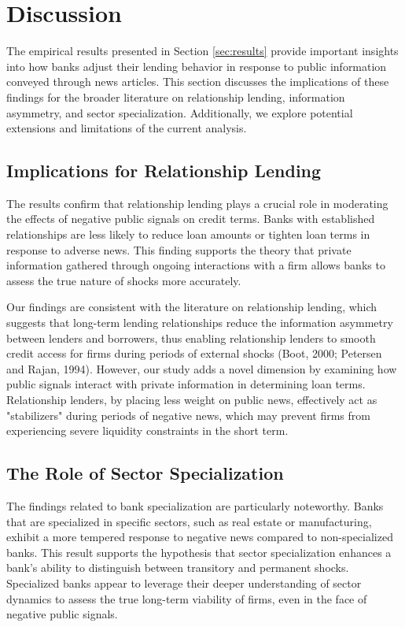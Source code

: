 \section{Discussion}
\label{sec:discussion}

The empirical results presented in Section \ref{sec:results} provide important insights into how banks adjust their lending behavior in response to public information conveyed through news articles. This section discusses the implications of these findings for the broader literature on relationship lending, information asymmetry, and sector specialization. Additionally, we explore potential extensions and limitations of the current analysis.

\subsection{Implications for Relationship Lending}

The results confirm that relationship lending plays a crucial role in moderating the effects of negative public signals on credit terms. Banks with established relationships are less likely to reduce loan amounts or tighten loan terms in response to adverse news. This finding supports the theory that private information gathered through ongoing interactions with a firm allows banks to assess the true nature of shocks more accurately. 

Our findings are consistent with the literature on relationship lending, which suggests that long-term lending relationships reduce the information asymmetry between lenders and borrowers, thus enabling relationship lenders to smooth credit access for firms during periods of external shocks (Boot, 2000; Petersen and Rajan, 1994). However, our study adds a novel dimension by examining how public signals interact with private information in determining loan terms. Relationship lenders, by placing less weight on public news, effectively act as "stabilizers" during periods of negative news, which may prevent firms from experiencing severe liquidity constraints in the short term.

\subsection{The Role of Sector Specialization}

The findings related to bank specialization are particularly noteworthy. Banks that are specialized in specific sectors, such as real estate or manufacturing, exhibit a more tempered response to negative news compared to non-specialized banks. This result supports the hypothesis that sector specialization enhances a bank's ability to distinguish between transitory and permanent shocks. Specialized banks appear to leverage their deeper understanding of sector dynamics to assess the true long-term viability of firms, even in the face of negative public signals.

